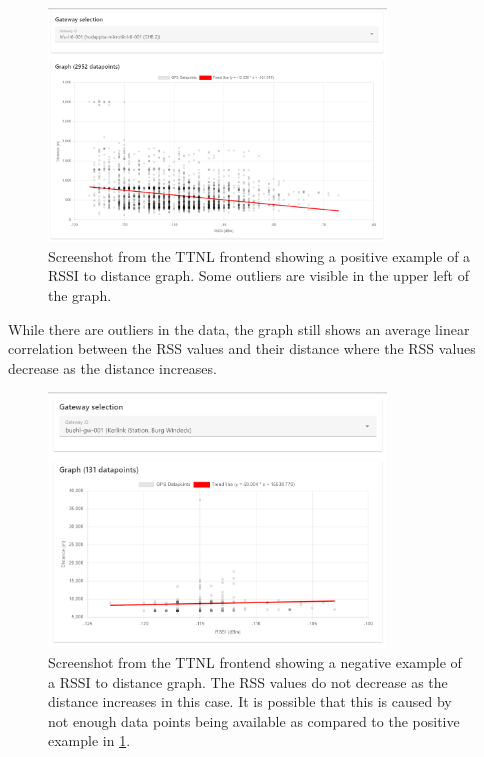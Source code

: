 \begin{figure}[htbp]
    \centering
    \includegraphics[width=0.8\textwidth]{pictures/ttn-locator/frontend/data/gateway_ghb_rssi_range_graph.png}
    \caption{
        Screenshot from the \ac{TTNL} frontend showing a positive example of a \ac{RSSI} to distance graph.
        Some outliers are visible in the upper left of the graph.
    }\label{fig:rssi-range-graph-positive-example}
\end{figure}

While there are outliers in the data, the graph still shows an average linear correlation between the \ac{RSS} values and their distance where the \ac{RSS} values decrease as the distance increases.

\begin{figure}[htbp]
    \centering
    \includegraphics[width=0.8\textwidth]{pictures/ttn-locator/frontend/data/gateway_buehl_gw_rssi_range_graph.png}
    \caption{
        Screenshot from the \ac{TTNL} frontend showing a negative example of a \ac{RSSI} to distance graph.
        The \ac{RSS} values do not decrease as the distance increases in this case.
        It is possible that this is caused by not enough data points being available as compared to the positive example in \cref{fig:rssi-range-graph-positive-example}.
    }\label{fig:rssi-range-graph-negative-example}
\end{figure}

